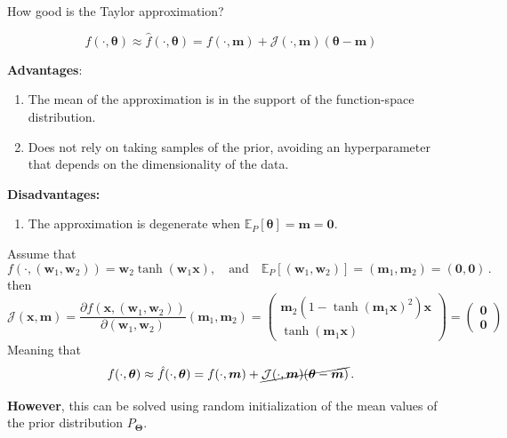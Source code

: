 
    \begin{frame}{How good is the Taylor approximation?}

        \[
            f(\cdot, \bm \theta) \approx \hat{f}(\cdot, \bm \theta) = f(\cdot, \bm m) + \mathcal{J}(\cdot, \bm m)(\bm \theta - \bm m) 
        \]

        \textbf{Advantages}: 
        \begin{enumerate}
            \item The mean of the approximation is in the support of the function-space distribution.
            \item Does not rely on taking samples of the prior, avoiding an hyperparameter that depends on the dimensionality of the data.
        \end{enumerate}
        \textbf{Disadvantages:}
        \begin{enumerate}
            \item The approximation is degenerate when \(\mathbb{E}_{P}[\bm \theta] = \bm m = \bm 0\).
        \end{enumerate}
    \end{frame}
    \begin{frame}
        Assume that 
        \[
        f(\cdot, (\bm w_1, \bm w_2)) = \bm w_2 \tanh (\bm w_1 \mathbf x), \quad \text{and} \quad 
        \mathbb{E}_{P}[(\bm w_1, \bm w_2)] =(\bm m_1, \bm m_2) = (\bm 0, \bm 0)\,.
        \]
        then
        \[
            \mathcal{J}(\mathbf x, \bm m) = \frac{\partial f(\mathbf x,(\bm w_1, \bm w_2))}{\partial (\bm w_1, \bm w_2)}(\bm m_1, \bm m_2) = 
            \begin{pmatrix}
                \bm m_2 (1 - \tanh(\bm m_1 \mathbf x)^2)\mathbf x\\
                \tanh (\bm m_1 \mathbf x)
            \end{pmatrix}
             =  \begin{pmatrix}
                \bm 0 \\
                \bm 0
            \end{pmatrix}
        \]
        Meaning that
        \[
            f(\cdot, \bm \theta) \approx \hat{f}(\cdot, \bm \theta) = f(\cdot, \bm m) + \cancel{\mathcal{J}(\cdot, \bm m)(\bm \theta - \bm m)}\,.
        \]

        \textbf{However}, this can be solved using random initialization of the mean values of the prior distribution \(P_{\bm \Theta}\).
    \end{frame}
    
